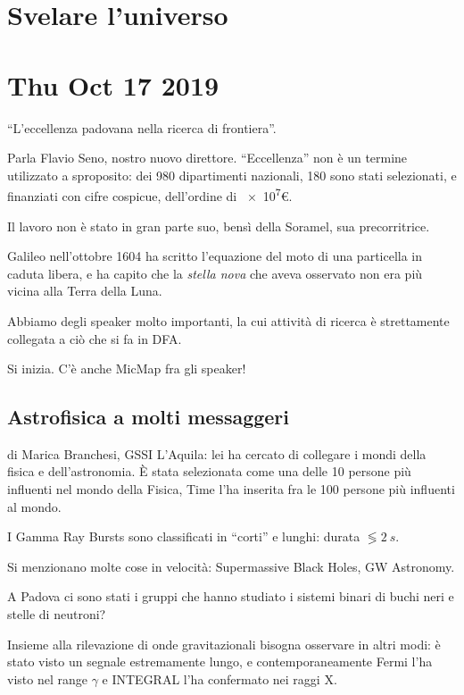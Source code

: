 \documentclass[main.tex]{subfiles}
\begin{document}
\section{Svelare l'universo}

\section*{Thu Oct 17 2019}

``L'eccellenza padovana nella ricerca di frontiera''.

Parla Flavio Seno, nostro nuovo direttore. 
``Eccellenza'' non è un termine utilizzato a sproposito: dei 980 dipartimenti nazionali, 180 sono stati selezionati, e finanziati con cifre cospicue, dell'ordine di \num{e7}€.

Il lavoro non è stato in gran parte suo, bensì della Soramel, sua precorritrice.

Galileo nell'ottobre 1604 ha scritto l'equazione del moto di una particella in caduta libera, e ha capito che la \emph{stella nova} che aveva osservato non era più vicina alla Terra della Luna.

Abbiamo degli speaker molto importanti, la cui attività di ricerca è strettamente collegata a ciò che si fa in DFA.

Si inizia. C'è anche MicMap fra gli speaker!

\subsection{Astrofisica a molti messaggeri}

di Marica Branchesi, GSSI L'Aquila: lei ha cercato di collegare i mondi della fisica e dell'astronomia. È stata selezionata come una delle 10 persone più influenti nel mondo della Fisica, Time l'ha inserita fra le 100 persone più influenti al mondo.

I Gamma Ray Bursts sono classificati in ``corti'' e lunghi: durata \(\lessgtr \SI{2}{s}\).  

Si menzionano molte cose in velocità: Supermassive Black Holes, GW Astronomy.

A Padova ci sono stati i gruppi che hanno studiato i sistemi binari di buchi neri e stelle di neutroni?

Insieme alla rilevazione di onde gravitazionali bisogna osservare in altri modi: è stato visto un segnale estremamente lungo, e contemporaneamente Fermi l'ha visto nel range \(\gamma \) e INTEGRAL l'ha confermato nei raggi X.
\end{document}
